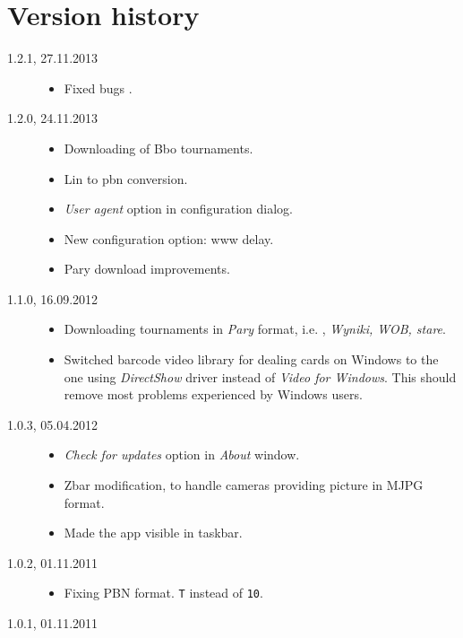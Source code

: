 \documentclass[polish,a4paper,11pt,oneside]{article}
\begin{document}
\section{Version history}
\begin{description}
\item[1.2.1, 27.11.2013]
  \begin{itemize}
  \item Fixed bugs \bugsonetwozero.
  \end{itemize}
\item[1.2.0, 24.11.2013]
  \begin{itemize}
  \item Downloading of Bbo tournaments.
  \item Lin to pbn conversion.
  \item {\em User agent} option in configuration dialog.
  \item New configuration option: www delay.
  \item Pary download improvements.
  \end{itemize}
\item[1.1.0, 16.09.2012]
  \begin{itemize}
  \item Downloading tournaments in {\em Pary} format,
        i.e. 
        , {\em Wyniki, WOB, stare}.
  \item Switched barcode video library for dealing cards on Windows
        to the one using
        {\em DirectShow} driver instead of
        {\em Video for Windows}. This should remove most problems
        experienced by Windows users.
  \end{itemize}
\item[1.0.3, 05.04.2012]
  \begin{itemize}
  \item {\em Check for updates} option in {\em About} window.
  \item Zbar modification, to handle cameras providing picture in
        MJPG format.
  \item Made the app visible in taskbar.
  \end{itemize}
\item[1.0.2, 01.11.2011]
  \begin{itemize}
  \item Fixing PBN format. \verb!T! instead of \verb!10!.
  \end{itemize}
\item[1.0.1, 01.11.2011]
  \begin{itemize}

\end{itemize}
\end{description}
\end{document}
